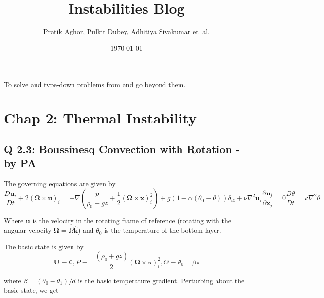 \documentclass{article}
\author{Pratik Aghor, Pulkit Dubey, Adhitiya Sivakumar et. al.}
\title{Instabilities Blog}
\date{\today}  %
\begin{document}
\maketitle
To solve and type-down problems from \cite{drazin2004hydrodynamic} and go beyond them. 
\section{Chap 2: Thermal Instability}
\subsection{Q 2.3: Boussinesq Convection with Rotation - by PA}
The governing equations are given by
\begin{subequations}
 \begin{equation}
  \frac{D\boldsymbol{u}_{i}}{Dt} + 2 (\boldsymbol{\Omega} \times \boldsymbol{u})_{i} = -\nabla \left(\frac{p}{\rho_{0} + gz} + \frac{1}{2}(\boldsymbol{\Omega} \times \boldsymbol{x})_{i}^{2}\right) + g ( 1 - \alpha  (\theta_{0} - \theta) ) \delta_{i3} + \nu \nabla^{2} \boldsymbol{u}_{i}
 \end{equation}
 \begin{equation}
  \frac{\partial \boldsymbol{u}_{j}}{\partial \boldsymbol{x}_{j}} = 0
 \end{equation}
 \begin{equation}
  \frac{D\theta}{Dt} = \kappa \nabla^{2} \theta
 \end{equation}
\end{subequations}

Where $\boldsymbol{u}$ is the velocity in the rotating frame of reference (rotating with the angular velocity $\boldsymbol{\Omega} = \Omega \boldsymbol{\hat{k}}$) and $\theta_{0}$ is the temperature of the bottom layer.

The basic state is given by
\begin{equation}
 \boldsymbol{U} = \boldsymbol{0}, P = - \frac{(\rho_{0} + gz)}{2} (\boldsymbol{\Omega} \times \boldsymbol{x})_{i}^{2}, \Theta = \theta_{0} - \beta z
\end{equation}

where $\beta = (\theta_{0} - \theta_{1})/d$ is the basic temperature gradient. Perturbing about the basic state, we get
\end{document}
